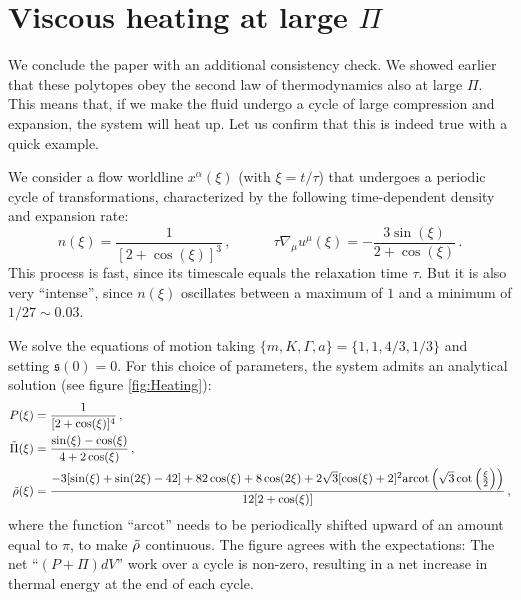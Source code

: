 \documentclass[a4paper, amsfonts, amssymb, amsmath, reprint, showkeys, nofootinbib, twoside,notitlepage,onecolumn]{revtex4-2}
\newcommand{\spc}{\quad \quad \quad}
\newcommand{\s}{{\mathfrak{s}}}
\theoremstyle{definition}
\theoremstyle{theorem}
\theoremstyle{corollary}
\begin{document}
\newpage
\section{Viscous heating at large $\Pi$}
\vspace{-0.3cm}


We conclude the paper with an additional consistency check. We showed earlier that these polytopes obey the second law of thermodynamics also at large $\Pi$. This means that, if we make the fluid undergo a cycle of large compression and expansion, the system will heat up. Let us confirm that this is indeed true with a quick example. 

We consider a flow worldline $x^\alpha(\xi)$ (with $\xi=t / \tau$) that undergoes a periodic cycle of transformations, characterized by the following time-dependent density and expansion rate:
\vspace{-0.2cm}
\begin{equation}\label{violuzzo}
n(\xi)= \frac{1}{[2+\cos (\xi )]^3} \, , \spc \tau \nabla_\mu u^\mu (\xi) =-\dfrac{3\sin(\xi)}{2+\cos(\xi)} \, .
\end{equation}
This process is fast, since its timescale equals the relaxation time $\tau$. But it is also very ``intense'', since $n(\xi)$ oscillates between a maximum of $1$ and a minimum of $1/27\sim 0.03$.

We solve the equations of motion taking $\{m,K,\Gamma,a\}=\{1,1,4/3,1/3 \}$ and setting $\s(0)=0$. For this choice of parameters, the system admits an analytical solution (see figure \ref{fig:Heating}):
\vspace{-0.2cm}
\begin{equation}\label{CheLungone}
\begin{split}
P(\xi)={}& \frac{1}{[2+\cos (\xi )]^4} \, , \\
\Tilde{\Pi}(\xi)={}& \frac{\sin (\xi )-\cos (\xi )}{4+2 \cos (\xi )} \, , \\
\Tilde{\rho}(\xi)={}& \frac{-3 [\sin (\xi )+\sin (2 \xi )-42]+82 \cos (\xi )+8 \cos (2 \xi )+2 \sqrt{3} [\cos (\xi )+2]^2 \text{arcot} \left(\sqrt{3} \cot \left(\frac{\xi }{2}\right)\right)}{12 [2+\cos (\xi )]} \, , \\
\end{split}
\end{equation}
where the function ``$\text{arcot}$'' needs to be periodically shifted upward of an amount equal to $\pi$, to make $\Tilde{\rho}$ continuous. The figure agrees with the expectations: The net ``$(P{+}\Pi)dV$'' work over a cycle is non-zero, resulting in a net increase in thermal energy at the end of each cycle.
\end{document}
